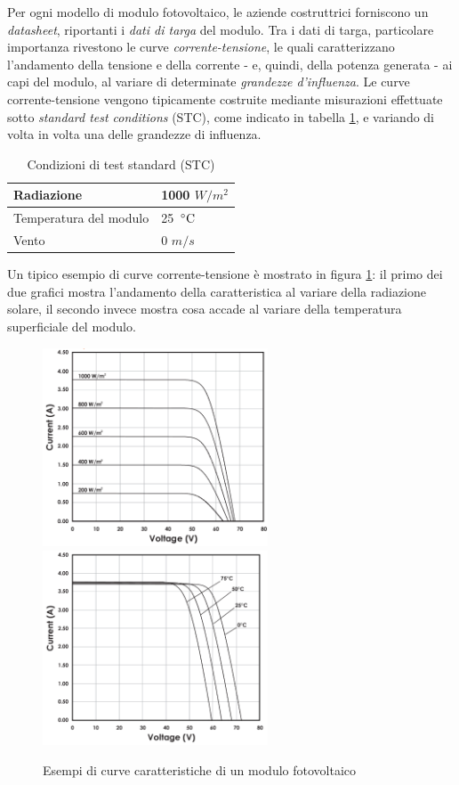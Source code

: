 %
Per ogni modello di modulo fotovoltaico, le aziende 
costruttrici forniscono un \emph{datasheet}, riportanti i 
\emph{dati di targa} del modulo.
%
Tra i dati di targa, particolare importanza rivestono le curve 
\emph{corrente-tensione}, le quali caratterizzano l'andamento della tensione 
e della corrente - e, quindi, della potenza generata - ai capi del modulo, al 
variare di determinate \emph{grandezze d'influenza}.
%
Le curve corrente-tensione vengono tipicamente costruite mediante misurazioni
effettuate sotto \emph{standard test conditions} (STC)\cite{testconditions}, 
come indicato in tabella \ref{stc}, e variando di volta in volta una delle 
grandezze di influenza.
%
\begin{table}[htpb]
 \begin{center}
  \begin{tabular}{ | l | l | }
    \hline
    Radiazione & 1000 $W/m^2$ \\
    \hline
    Temperatura del modulo & 25  $\celsius$ \\
    \hline 
    Vento & 0 $m/s$ \\
    \hline
  \end{tabular}
  \caption{Condizioni di test standard (STC)}
  \label{stc}
 \end{center}
\end{table}
%

%
Un tipico esempio di curve corrente-tensione \`e mostrato in figura 
\ref{caratteristica_modulo_fv}: il primo dei due grafici mostra l'andamento 
della caratteristica al variare della radiazione solare, il secondo
invece mostra cosa accade al variare della temperatura superficiale del modulo.
%
\begin{figure}[!h]
\centering
\includegraphics[width=190pt]{img/a-v-irradiance.png}
\includegraphics[width=190pt]{img/a-v-temperature.png}
\caption{Esempi di curve caratteristiche di un modulo fotovoltaico}
\label{caratteristica_modulo_fv}
\end{figure}
%

